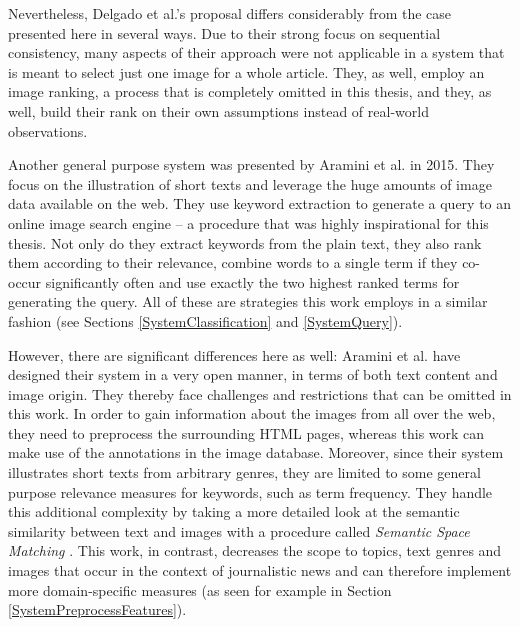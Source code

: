 \documentclass[11pt,a4paper,twoside]{article}
\begin{document}
Nevertheless, Delgado et al.'s proposal differs considerably from the case presented here in several ways. Due to their strong focus on sequential consistency, many aspects of their approach were not applicable in a system that is meant to select just one image for a whole article. They, as well, employ an image ranking, a process that is completely omitted in this thesis, and they, as well, build their rank on their own assumptions instead of real-world observations.

\bigskip

Another general purpose system was presented by Aramini et al. in 2015. \cite{Aramini2015AutomaticImages} They focus on the illustration of short texts and leverage the huge amounts of image data available on the web. They use keyword extraction to generate a query to an online image search engine -- a procedure that was highly inspirational for this thesis. Not only do they extract keywords from the plain text, they also rank them according to their relevance, combine words to a single term if they co-occur significantly often and use exactly the two highest ranked terms for generating the query. All of these are strategies this work employs in a similar fashion (see Sections \ref{SystemClassification} and \ref{SystemQuery}).

However, there are significant differences here as well: Aramini et al. have designed their system in a very open manner, in terms of both text content and image origin. They thereby face challenges and restrictions that can be omitted in this work. In order to gain information about the images from all over the web, they need to preprocess the surrounding HTML pages, whereas this work can make use of the annotations in the image database. Moreover, since their system illustrates short texts from arbitrary genres, they are limited to some general purpose relevance measures for keywords, such as term frequency. They handle this additional complexity by taking a more detailed look at the semantic similarity between text and images with a procedure called \emph{Semantic Space Matching} \cite[pp. 140-144]{Aramini2015AutomaticImages}. This work, in contrast, decreases the scope to topics, text genres and images that occur in the context of journalistic news and can therefore implement more domain-specific measures (as seen for example in Section \ref{SystemPreprocessFeatures}).

\bigskip
\end{document}
